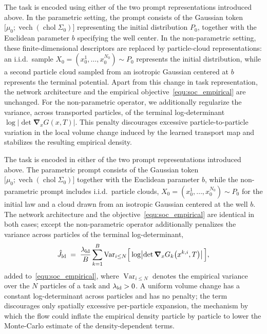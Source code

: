 \documentclass[preprint]{elsarticle}
\begin{document}
The task is encoded using either of the two prompt representations introduced above. In the parametric setting, the prompt consists of the Gaussian token $\bigl[\mu_0;\operatorname{vech}(\operatorname{chol}\Sigma_0)\bigr]$ representing the initial distribution $P_0$, together with the Euclidean parameter $b$ specifying the well center. In the non-parametric setting, these finite-dimensional descriptors are replaced by particle-cloud representations: an i.i.d.\ sample $X_0=(x_0^1,\ldots,x_0^{N_0})\sim P_0$ represents the initial distribution, while a second particle cloud sampled from an isotropic Gaussian centered at $b$ represents the terminal potential. Apart from this change in task representation, the network architecture and the empirical objective~\eqref{equ:soc_empirical} are unchanged. For the non-parametric operator, we additionally regularize the variance, across transported particles, of the terminal log-determinant $\log\bigl|\det\boldsymbol{\nabla}_xG(x,T)\bigr|$. This penalty discourages excessive particle-to-particle variation in the local volume change induced by the learned transport map and stabilizes the resulting empirical density.

The task is encoded in either of the two prompt representations introduced above. The parametric prompt consists of the Gaussian token $\bigl[\mu_0;\operatorname{vech}(\operatorname{chol}\Sigma_0)\bigr]$ together with the Euclidean parameter $b$, while the non-parametric prompt includes i.i.d.\ particle clouds, $X_0=(x_0^1,\ldots,x_0^{N_0})\sim P_0$ for the initial law and a cloud drawn from an isotropic Gaussian centered at the well $b$.
The network architecture and the objective~\eqref{equ:soc_empirical} are identical in both cases; except the non-parametric operator additionally penalizes the variance across particles of the terminal log-determinant,
\begin{align}
\hat J_{\rm ld}
\;=\;
\frac{\lambda_{\rm ld}}{B}\sum_{k=1}^{B}
\operatorname{Var}_{i\le N}
\Bigl[\,
\log\bigl|\det\boldsymbol{\nabla}_xG_k\bigl(x^{k,i},T\bigr)\bigr|
\,\Bigr],
\label{equ:ld_penalty}
\end{align}
added to~\eqref{equ:soc_empirical}, where $\operatorname{Var}_{i\le N}$ denotes the empirical variance over the $N$ particles of a task and $\lambda_{\rm ld}>0$. A uniform volume change has a constant log-determinant across particles and has no penalty; the term discourages only spatially excessive per-particle expansion, the mechanism by which the flow could inflate the empirical density particle by particle to lower the Monte-Carlo estimate of the density-dependent terms.
\end{document}
